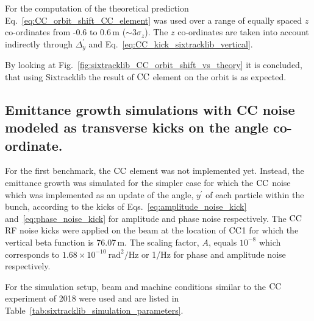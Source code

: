 For the computation of the theoretical prediction Eq.~\eqref{eq:CC_orbit_shift_CC_element} was used over a range of equally spaced $z$ co-ordinates from -0.6 to 0.6\,m ($\sim 3 \sigma_z$). The $z$ co-ordinates are taken into account indirectly through $\Delta_y^\prime$ and Eq.~\eqref{eq:CC_kick_sixtracklib_vertical}.

By looking at Fig.~\ref{fig:sixtracklib_CC_orbit_shift_vs_theory} it is concluded, that using Sixtracklib the result of ${\mathrm{CC}}$ element on the orbit is as expected. %


\subsection{Emittance growth simulations with CC noise modeled as transverse kicks on the angle co-ordinate.}\label{subsec:sixtracklib_kicks_transverse_angle}
For the first benchmark, the ${\mathrm{CC}}$ element was not implemented yet. Instead, the emittance growth was simulated for the simpler case for which the ${\mathrm{CC}}$ noise which was implemented as an update of the angle, $y^\prime$ of each particle within the bunch, according to the kicks of Eqs.~\eqref{eq:amplitude_noise_kick} and~\eqref{eq:phase_noise_kick} for amplitude and phase noise respectively. The ${\mathrm{CC}}$ RF noise kicks were applied on the beam at the location of ${\mathrm{CC}}$1 for which the vertical beta function is 76.07\,m. The scaling factor, $A$, equals $10^{-8}$ which corresponds to $1.68 \times 10^{-10} \ \mathrm{rad^2/Hz}$ or 1/Hz for phase and amplitude noise respectively.

For the simulation setup, beam and machine conditions similar to the ${\mathrm{CC}}$ experiment of 2018 were used and are listed in Table~\ref{tab:sixtracklib_simulation_parameters}.

